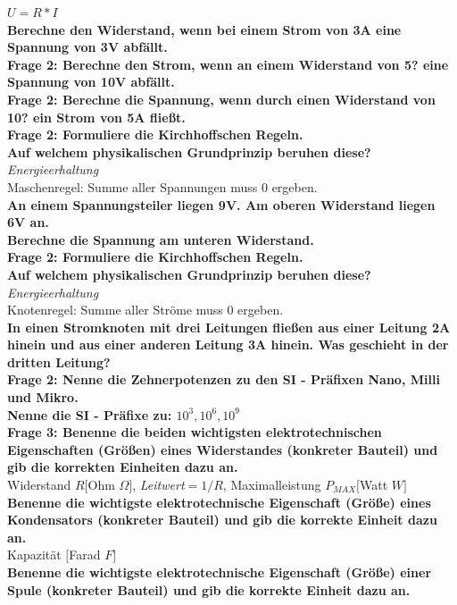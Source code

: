 \documentclass[11pt,a4paper]{scrartcl}
\begin{document}
$U=R*I$\\
\textbf{Berechne den Widerstand, wenn bei einem Strom von 3A eine Spannung von 3V abfällt.}\\
\textbf{Frage 2: Berechne den Strom, wenn an einem Widerstand von 5? eine Spannung von 10V abfällt.}\\
\textbf{Frage 2: Berechne die Spannung, wenn durch einen Widerstand von 10? ein Strom von 5A fließt. }\\
\textbf{Frage 2: Formuliere die Kirchhoffschen Regeln.}\\
\textbf{Auf welchem physikalischen Grundprinzip beruhen diese?}\\
\textit{Energieerhaltung}\\
Maschenregel: Summe aller Spannungen muss 0 ergeben.\\
\textbf{An einem Spannungsteiler liegen 9V. Am oberen Widerstand liegen 6V an.}\\
\textbf{Berechne die Spannung am unteren Widerstand.}\\
\textbf{Frage 2: Formuliere die Kirchhoffschen Regeln.\\
Auf welchem physikalischen Grundprinzip beruhen diese?}\\
\textit{Energieerhaltung}\\
Knotenregel: Summe aller Ströme muss 0 ergeben.\\
\textbf{In einen Stromknoten mit drei Leitungen fließen aus einer Leitung 2A hinein und aus einer anderen Leitung 3A hinein. Was geschieht in der dritten Leitung?}\\
\textbf{Frage 2: Nenne die Zehnerpotenzen zu den SI - Präfixen Nano, Milli und Mikro.\\
Nenne die SI - Präfixe zu: $10^3, 10^6, 10^9$}\\
\textbf{Frage 3: Benenne die beiden wichtigsten elektrotechnischen Eigenschaften (Größen) eines Widerstandes (konkreter Bauteil) und gib die korrekten Einheiten dazu an.}\\
Widerstand $R[$Ohm $\Omega]$, \textit{Leitwert}$=1/R$, Maximalleistung $P_{MAX}[$Watt $W]$\\
\textbf{Benenne die wichtigste elektrotechnische Eigenschaft (Größe) eines Kondensators (konkreter Bauteil) und gib die korrekte Einheit dazu an.}\\
Kapazität $[$Farad $F]$\\
\textbf{Benenne die wichtigste elektrotechnische Eigenschaft (Größe) einer Spule (konkreter Bauteil) und gib die korrekte Einheit dazu an.}\\
\end{document}
